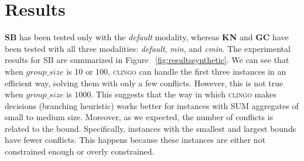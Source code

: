 \section{Results}

\textbf{SB} has been tested only with the \textit{default} modality, 
whereas \textbf{KN} and \textbf{GC} have been tested with all three modalities:
\textit{default}, \textit{min}, and \textit{cmin}.
The experimental results for SB are summarized in Figure ~\ref{fig:resultssynthetic}. 
We can see that when $\mathit{group\_size}$ is 10 or 100, \textsc{clingo} can handle 
the first three instances in an efficient way, solving them with only a few conflicts. 
However, this is not true when $\mathit{group\_size}$ is $1000$. This suggests that the way 
in which \textsc{clingo} makes decisions (branching heuristic) works better for instances with 
SUM aggregates of small to medium size.
Moreover, as we expected, the number of conflicts is related to the bound. Specifically, 
instances with the smallest and largest bounds have fewer conflicts. 
This happens because these instances are either not constrained enough or overly constrained.


